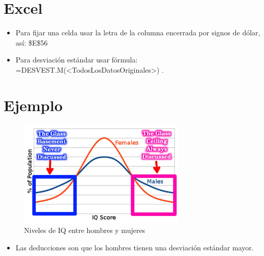 \section{Excel}
\begin{itemize}
    \item Para fijar una celda usar la letra de la columna encerrada por signos de dólar, así: \$E\$56
    \item Para desviación estándar usar fórmula: =DESVEST.M(<TodosLosDatosOriginales>) .
\end{itemize}


\section{Ejemplo}
\begin{figure}[htbp]
    \centering
    \includegraphics[width=8cm]{../__Imagenes__/2020-01-16-01-ESTADISTICA.jpg}
    \caption{Niveles de IQ entre hombres y mujeres}
    \label{}
\end{figure} 

\begin{itemize}
    \item Las deducciones son que los hombres tienen una desviación estándar mayor.
\end{itemize}
